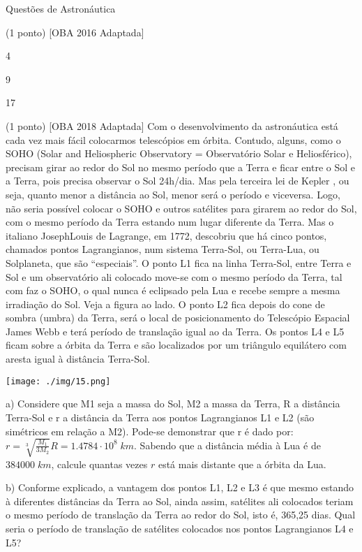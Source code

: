 \documentclass{../lista}
\begin{document}
\begin{secao}{Questões de Astronáutica}
\begin{questao}{(1 ponto) [OBA 2016 Adaptada]}
			\begin{alternativas}
				\item 4
				\item 9
				\item 17
			\end{alternativas}
		\end{questao}
		\begin{questao}{(1 ponto) [OBA 2018 Adaptada]}
			Com o desenvolvimento da astronáutica está cada vez mais fácil colocarmos telescópios em órbita. Contudo, alguns, como o SOHO (Solar and Heliospheric Observatory = Observatório Solar e Heliosférico), precisam girar ao redor do Sol no mesmo período que a Terra e ficar entre o Sol e a Terra, pois precisa observar o Sol 24h/dia. Mas pela terceira lei de Kepler , ou seja, quanto menor a distância ao Sol, menor será o período e viceversa. Logo, não seria possível colocar o SOHO e outros satélites para girarem ao redor do Sol, com o mesmo período da Terra estando num lugar diferente da Terra. Mas o italiano JosephLouis de Lagrange, em 1772, descobriu que há cinco pontos, chamados pontos Lagrangianos, num sistema Terra-Sol, ou Terra-Lua, ou Solplaneta, que são “especiais”. O ponto L1 fica na linha Terra-Sol, entre Terra e Sol e um observatório ali colocado move-se com o mesmo período da Terra, tal com faz o SOHO, o qual nunca é eclipsado pela Lua e recebe sempre a mesma irradiação do Sol. Veja a figura ao lado. O ponto L2 fica depois do cone de sombra (umbra) da Terra, será o local de posicionamento do Telescópio Espacial James Webb e terá período de translação igual ao da Terra. Os pontos L4 e L5 ficam sobre a órbita da Terra e são localizados por um triângulo equilátero com aresta igual à distância Terra-Sol.
			
			\begin{center}
				\texttt{[image: ./img/15.png]}
			\end{center}
		
			a) Considere que M1 seja a massa do Sol, M2 a massa da Terra, R a distância Terra-Sol e r a distância da Terra aos pontos Lagrangianos L1 e L2 (são simétricos em relação a M2). Pode-se demonstrar que r é dado por: $ r = \sqrt[3]{\frac{M_{1}}{3 M_{2}}} R = 1.4784 \cdot 10^{8} \; km$. Sabendo que a distância média à Lua é de $384000 \; km$, calcule quantas vezes $r$ está mais distante que a órbita da Lua.
			
			b) Conforme explicado, a vantagem dos pontos L1, L2 e L3 é que mesmo
			estando à diferentes distâncias da Terra ao Sol, ainda assim, satélites ali colocados teriam o mesmo período de translação da Terra ao redor do Sol, isto é, 365,25 dias. Qual seria o período de translação de satélites colocados nos pontos Lagrangianos L4 e L5?
			

\end{questao}
\end{secao}
\end{document}
